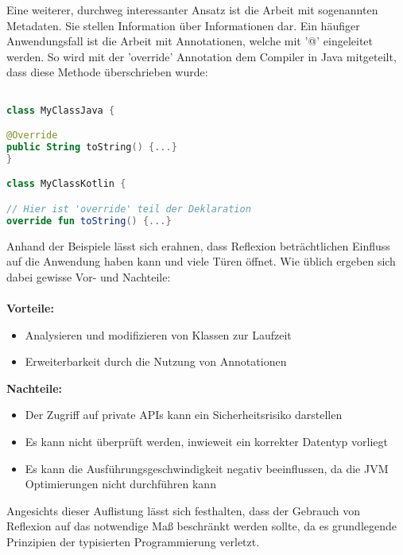 \bigskip
Eine weiterer, durchweg interessanter Ansatz ist die Arbeit mit sogenannten Metadaten. Sie stellen Information über Informationen dar. Ein häufiger Anwendungsfall ist die Arbeit mit Annotationen, welche mit '@' eingeleitet werden. So wird mit der 'override' Annotation dem Compiler in Java mitgeteilt, dass diese Methode überschrieben wurde:
\begin{lstlisting}[caption={Override Annotation}, label={lst:data-class}, language=Kotlin]

class MyClassJava {

@Override
public String toString() {...}
}

class MyClassKotlin {

// Hier ist 'override' teil der Deklaration
override fun toString() {...}
\end{lstlisting}
\bigskip
Anhand der Beispiele lässt sich erahnen, dass Reflexion beträchtlichen Einfluss auf die Anwendung haben kann und viele Türen öffnet. Wie üblich ergeben sich dabei gewisse Vor- und Nachteile:
\\
\\
\textbf{Vorteile:}
\begin{itemize}
	\item Analysieren und modifizieren von Klassen zur Laufzeit
	\item Erweiterbarkeit durch die Nutzung von Annotationen 
\end{itemize}
\textbf{Nachteile:}
\begin{itemize}
	\item Der Zugriff auf private APIs kann ein Sicherheitsrisiko darstellen
	\item Es kann nicht überprüft werden, inwieweit ein korrekter Datentyp vorliegt
	\item Es kann die Ausführungsgeschwindigkeit negativ beeinflussen, da die JVM Optimierungen nicht durchführen kann 
\end{itemize}
Angesichts dieser Auflistung lässt sich festhalten, dass der Gebrauch von Reflexion auf das notwendige Maß beschränkt werden sollte, da es grundlegende Prinzipien der typisierten Programmierung verletzt.

